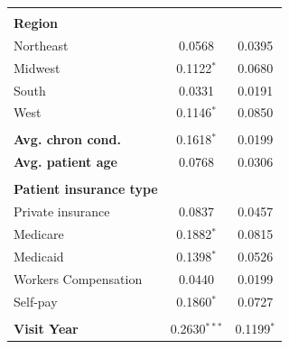 \documentclass[12pt]{report}
\begin{document}
{\begin{center}
\begin{longtable}{lSS[table-format = 0.4]}
                                       &                          &                           \\
\textbf{Region}                        &                          &                           \\
Northeast                              & 0.0568                   & 0.0395                    \\
Midwest                                & 0.1122$^{*}$               & 0.0680                    \\
South                                  & 0.0331                   & 0.0191                    \\
West                                   & 0.1146$^{*}$               & 0.0850                    \\
                                       &                          &                           \\
\textbf{Avg. chron cond.}              & 0.1618$^{*}$               & 0.0199                    \\
\textbf{Avg. patient age}              & 0.0768                   & 0.0306                    \\
                                       &                          &                           \\
\textbf{Patient insurance type}        &                          &                           \\
Private insurance                      & 0.0837                   & 0.0457                    \\
Medicare                               & 0.1882$^{*}$               & 0.0815                    \\
Medicaid                               & 0.1398$^{*}$               & 0.0526                    \\
Workers Compensation                   & 0.0440                   & 0.0199                    \\
Self-pay                               & 0.1860$^{*}$               & 0.0727                    \\
                                       &                          &                           \\
\textbf{Visit Year}                    & 0.2630$^{***}$               & 0.1199$^{*}$    \\

\end{longtable}
\end{center}}
\end{document}
